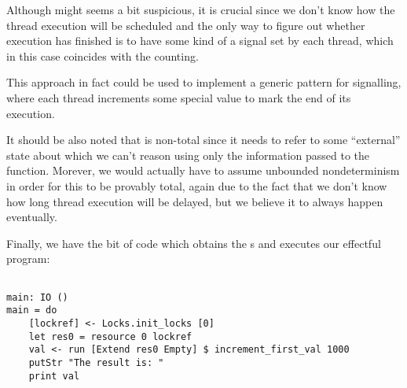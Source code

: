 Although  might seems a bit suspicious, it is crucial
since we don't know how the thread execution will be scheduled and the only way
to figure out whether execution has finished is to have some kind of a signal
set by each thread, which in this case coincides with the counting.

This approach in fact could be used to implement a generic pattern for
signalling, where each thread increments some special value to mark the end of
its execution.

It should be also noted that  is non-total since
it needs to refer to some ``external'' state about which we can't reason using
only the information passed to the function. Morever, we would actually have to
assume unbounded nondeterminism in order for this to be provably total, again
due to the fact that we don't know how long thread execution will be delayed,
but we believe it to always happen eventually.

Finally, we have the bit of code which obtains the s and executes
our effectful program:

\begin{BVerbatim}

main: IO ()
main = do
    [lockref] <- Locks.init_locks [0]
    let res0 = resource 0 lockref
    val <- run [Extend res0 Empty] $ increment_first_val 1000
    putStr "The result is: "
    print val

\end{BVerbatim}

